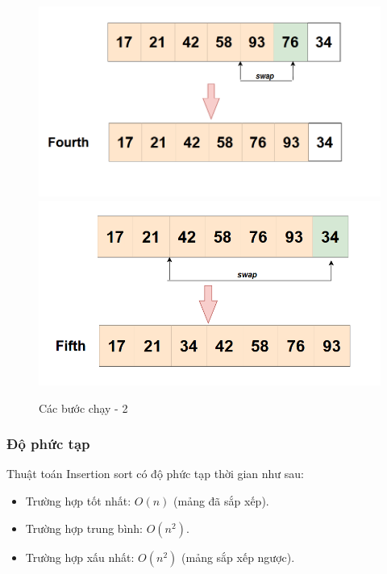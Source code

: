 \begin{figure}[H]
    \centering
    \includegraphics[width=1\linewidth]{img/Insertion sort/4.png}
    \vspace{0.5cm}
    \includegraphics[width=1\linewidth]{img/Insertion sort/5.png}
  
    \caption{Các bước chạy - 2}
    \label{fig:part2}
\end{figure}






\subsubsection{Độ phức tạp}
Thuật toán Insertion sort có độ phức tạp thời gian như sau:
\begin{itemize}
    \item Trường hợp tốt nhất: $O(n)$ (mảng đã sắp xếp).
    \item Trường hợp trung bình: $O(n^2)$.
    \item Trường hợp xấu nhất: $O(n^2)$ (mảng sắp xếp ngược).
\end{itemize}